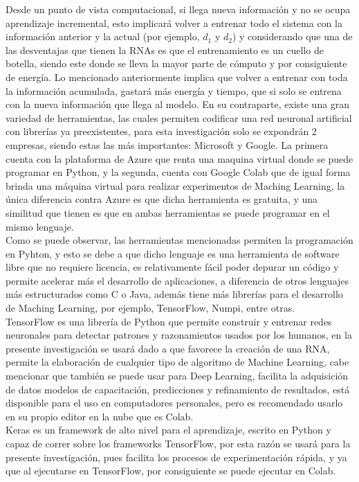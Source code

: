     Desde un punto de vista computacional, si llega nueva información y no se ocupa aprendizaje 
    incremental, esto implicar\'a volver a entrenar todo el sistema con la información anterior y 
    la actual (por ejemplo, $d_{1}$ y $d_{2}$) y considerando que una de las desventajas que tienen la 
    RNAs es que el entrenamiento es un cuello de botella, siendo este donde se lleva la mayor 
    parte de cómputo y por consiguiente de energía. Lo mencionado anteriormente implica que volver a entrenar con toda 
    la información acumulada, gastará más energía y tiempo, que si solo se entrena con la nueva 
    información que llega al modelo. En su contraparte,  existe una gran variedad de herramientas,
    las cuales permiten codificar una red neuronal artificial con librerías ya preexistentes, para esta investigación solo se 
    expondrán 2 empresas, siendo estas las más importantes: Microsoft y Google. 
    La primera cuenta con la plataforma de Azure que renta una maquina virtual donde se puede 
    programar en Python, y la segunda, cuenta con Google Colab que de igual forma brinda 
    una m\'aquina virtual para realizar experimentos de Maching Learning, la \'unica diferencia 
    contra Azure es que dicha herramienta es gratuita, y una similitud que tienen es que en ambas herramientas
    se puede programar en el mismo lenguaje.\\

    Como se puede observar, las herramientas mencionadas permiten la programación en Pyhton, y esto se debe a que 
    dicho lenguaje es una herramienta de software libre que no requiere licencia, es relativamente 
    fácil poder depurar un código y permite acelerar más el desarrollo de aplicaciones,  a diferencia 
    de otros lenguajes más estructurados como C o Java, adem\'as tiene m\'as librerías para el 
    desarrollo de Maching Learning, por ejemplo, TensorFlow, Numpi, entre otras. \\

    TensorFlow es una librería de Python que permite construir y entrenar redes neuronales para 
    detectar patrones y razonamientos usados por los humanos, en la presente investigaci\'on se 
    usar\'a dado a que favorece la creaci\'on de una RNA, permite la elaboraci\'on de cualquier 
    tipo de algoritmo de Machine Learning, cabe mencionar que también se puede usar para Deep Learning, 
    facilita la adquisici\'on de datos modelos de capacitaci\'on, predicciones y refinamiento de 
    resultados, est\'a disponible para el uso en computadores personales, pero es recomendado 
    usarlo en su propio editor en la nube que es Colab.\\
    
    Keras es un framework de alto nivel para 
    el aprendizaje, escrito en Python y capaz de correr sobre los frameworks TensorFlow, por esta razón se usar\'a para la presente investigación, pues facilita los procesos de experimentación rápida, y ya que al ejecutarse en TensorFlow, por consiguiente se puede ejecutar en Colab.